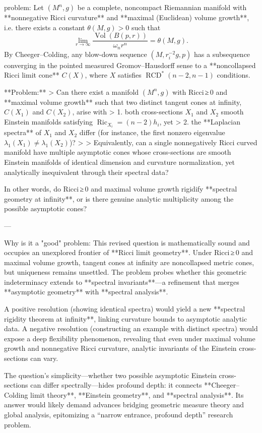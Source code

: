 problem:  
Let \((M^n,g)\) be a complete, noncompact Riemannian manifold with **nonnegative Ricci curvature** and **maximal (Euclidean) volume growth**, i.e. there exists a constant \(\theta(M,g) > 0\) such that  
\[
\lim_{r\to\infty}\frac{\operatorname{Vol}(B(p,r))}{\omega_n r^n} = \theta(M,g).
\]  
By Cheeger–Colding, any blow-down sequence \((M,r_i^{-2}g,p)\) has a subsequence converging in the pointed measured Gromov–Hausdorff sense to a **noncollapsed Ricci limit cone** \(C(X)\), where \(X\) satisfies \(\operatorname{RCD}^*(n-2,n-1)\) conditions.  

**Problem:**  
> Can there exist a manifold \((M^n,g)\) with Ricci ≥ 0 and **maximal volume growth** such that two distinct tangent cones at infinity, \(C(X_1)\) and \(C(X_2)\), arise with  
> 1. both cross-sections \(X_1\) and \(X_2\) smooth Einstein manifolds satisfying \(\operatorname{Ric}_{X_i} = (n-2)h_i\), yet  
> 2. the **Laplacian spectra** of \(X_1\) and \(X_2\) differ (for instance, the first nonzero eigenvalue \(\lambda_1(X_1)\neq \lambda_1(X_2)\))?
> 
> Equivalently, can a single nonnegatively Ricci curved manifold have multiple asymptotic cones whose cross-sections are smooth Einstein manifolds of identical dimension and curvature normalization, yet analytically inequivalent through their spectral data?

In other words, do Ricci ≥ 0 and maximal volume growth rigidify **spectral geometry at infinity**, or is there genuine analytic multiplicity among the possible asymptotic cones?

---

Why is it a "good" problem:  
This revised question is mathematically sound and occupies an unexplored frontier of **Ricci limit geometry**. Under Ricci ≥ 0 and maximal volume growth, tangent cones at infinity are noncollapsed metric cones, but uniqueness remains unsettled. The problem probes whether this geometric indeterminacy extends to **spectral invariants**—a refinement that merges **asymptotic geometry** with **spectral analysis**.  

A positive resolution (showing identical spectra) would yield a new **spectral rigidity theorem at infinity**, linking curvature bounds to asymptotic analytic data. A negative resolution (constructing an example with distinct spectra) would expose a deep flexibility phenomenon, revealing that even under maximal volume growth and nonnegative Ricci curvature, analytic invariants of the Einstein cross-sections can vary.  

The question’s simplicity—whether two possible asymptotic Einstein cross-sections can differ spectrally—hides profound depth: it connects **Cheeger–Colding limit theory**, **Einstein geometry**, and **spectral analysis**. Its answer would likely demand advances bridging geometric measure theory and global analysis, epitomizing a “narrow entrance, profound depth” research problem.